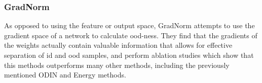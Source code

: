 \documentclass[UKenglish]{uiomasterthesis} %
\theoremstyle{definition}
\begin{document}
%
%
%
%
%
%

\subsubsection{GradNorm}

As opposed to using the feature or output space, GradNorm \cite{gradnorm} attempts to use the gradient space of a network to calculate \ac{ood}-ness. They find that the gradients of the weights actually contain valuable information that allows for effective separation of \ac{id} and \ac{ood} samples, and perform ablation studies which show that this methods outperforms many other methods, including the previously mentioned ODIN and Energy methods.
\end{document}
